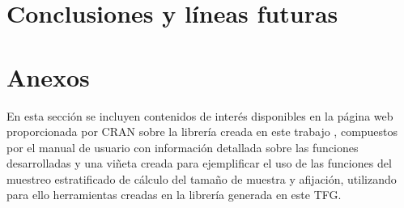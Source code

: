 \documentclass[12pt,twoside]{report}
\begin{document}
\newpage
\chapter{Conclusiones y líneas futuras}


\newpage



\newpage
{}
\printbibliography 



\newpage
\chapter*{Anexos}
En esta sección se incluyen contenidos de interés disponibles en la página web proporcionada por CRAN sobre la librería creada en este trabajo \cite{samplingRweb}, compuestos por el manual de usuario con información detallada sobre las funciones desarrolladas y una viñeta creada para ejemplificar el uso de las funciones del muestreo estratificado de cálculo del tamaño de muestra y afijación, utilizando para ello herramientas creadas en la librería generada en este TFG.


\label{sect:vignette}

\end{document}
